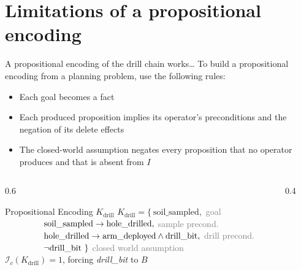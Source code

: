 \section{Limitations of a propositional encoding}

\begin{frame}{A propositional encoding of the drill chain works\dots}
    To build a propositional encoding from a planning problem, use the following rules:
    \begin{itemize}
        \item Each goal becomes a fact
        \item Each produced proposition implies its operator's preconditions and the negation of its delete effects
        \item The closed-world assumption negates every proposition that no operator produces and that is absent from $I$
    \end{itemize}

    \begin{columns}[T]
        \begin{column}{0.6\textwidth}
            \begin{exampleblock}{Propositional Encoding $K_{\text{drill}}$}
                \footnotesize
                $K_{\text{drill}} = \{\ \text{soil\_sampled},$ \hfill {\scriptsize\textcolor{gray}{goal}} \\[2pt]
                $\hphantom{K_{\text{drill}} = \{\ } \text{soil\_sampled} \rightarrow \text{hole\_drilled},$ \hfill {\scriptsize\textcolor{gray}{sample precond.}} \\[2pt]
                $\hphantom{K_{\text{drill}} = \{\ } \text{hole\_drilled} \rightarrow \text{arm\_deployed} \land \text{drill\_bit},$ \hfill {\scriptsize\textcolor{gray}{drill precond.}} \\[2pt]
                $\hphantom{K_{\text{drill}} = \{\ } \neg \text{drill\_bit}\ \}$ \hfill {\scriptsize\textcolor{gray}{closed world assumption}} \\[4pt]
                $\mathcal{I}_c(K_{\text{drill}}) = 1$, forcing \textit{drill\_bit} to $B$
            \end{exampleblock}
        \end{column}
        \begin{column}{0.4\textwidth}
            \centering
            
        \end{column}
    \end{columns}

\end{frame}

